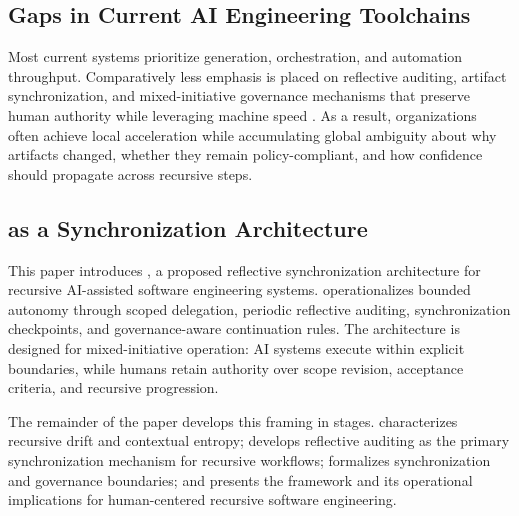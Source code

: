 \subsection{Gaps in Current AI Engineering Toolchains}

Most current systems prioritize generation, orchestration, and automation throughput. Comparatively less emphasis is placed on reflective auditing, artifact synchronization, and mixed-initiative governance mechanisms that preserve human authority while leveraging machine speed \cite{Amershi2014InteractiveML,Shneiderman2020HCAI}. As a result, organizations often achieve local acceleration while accumulating global ambiguity about why artifacts changed, whether they remain policy-compliant, and how confidence should propagate across recursive steps.

\subsection{ as a Synchronization Architecture}

This paper introduces \textit{}, a proposed reflective synchronization architecture for recursive AI-assisted software engineering systems.  operationalizes bounded autonomy through scoped delegation, periodic reflective auditing, synchronization checkpoints, and governance-aware continuation rules. The architecture is designed for mixed-initiative operation: AI systems execute within explicit boundaries, while humans retain authority over scope revision, acceptance criteria, and recursive progression.

The remainder of the paper develops this framing in stages.  characterizes recursive drift and contextual entropy;  develops reflective auditing as the primary synchronization mechanism for recursive workflows;  formalizes synchronization and governance boundaries; and  presents the  framework and its operational implications for human-centered recursive software engineering.
